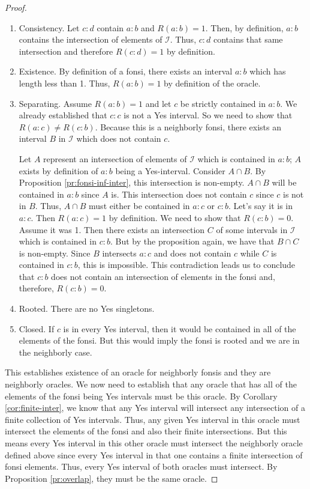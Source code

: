 \documentclass[12pt]{article}
\begin{document}
\begin{proof}
\begin{enumerate}
    \item Consistency. Let $c:d$ contain $a:b$ and $R(a:b)=1$. Then, by definition, $a:b$ contains the intersection of elements of $\mathcal{I}$. Thus, $c:d$ contains that same intersection and therefore $R(c:d)=1$ by definition. 
    \item Existence. By definition of a fonsi, there exists an interval $a:b$ which has length less than 1. Thus, $R(a:b)=1$ by definition of the oracle.
    \item Separating. Assume $R(a:b)=1$ and let $c$ be strictly contained in $a:b$. We already established that $c:c$ is not a Yes interval. So we need to show that $R(a:c) \neq R(c:b)$. Because this is a neighborly fonsi, there exists an interval $B$ in $\mathcal{I}$ which does not contain $c$. 
    
    Let $A$ represent an intersection of elements of $\mathcal{I}$ which is contained in $a:b$; $A$ exists by definition of $a:b$ being a Yes-interval.   Consider $A \cap B$. By Proposition \ref{pr:fonsi-inf-inter}, this intersection is non-empty. $A \cap B$ will be contained in $a:b$ since $A$ is.  This intersection does not contain $c$ since $c$ is not in $B$. Thus, $A \cap B$ must either be contained in $a:c$ or $c:b$. Let's say it is in $a:c$. Then $R(a:c) = 1$ by definition. We need to show that $R(c:b) = 0$. Assume it was 1. Then there exists an intersection $C$ of some intervals in $\mathcal{I}$ which is contained in $c:b$. But by the proposition again, we have that $B \cap C$ is non-empty. Since $B$ intersects $a:c$ and does not contain $c$ while $C$ is contained in $c:b$, this is impossible. This contradiction leads us to conclude that $c:b$ does not contain an intersection of elements in the fonsi and, therefore, $R(c:b) = 0$.
    \item Rooted. There are no Yes singletons. 
    \item Closed. If $c$ is in every Yes interval, then it would be contained in all of the elements of the fonsi. But this would imply the fonsi is rooted and we are in the neighborly case. 
\end{enumerate}

This establishes existence of an oracle for neighborly fonsis and they are neighborly oracles. We now need to establish that any oracle that has all of the elements of the fonsi being Yes intervals must be this oracle. By Corollary \ref{cor:finite-inter}, we know that any Yes interval will intersect any intersection of a finite collection of Yes intervals. Thus, any given Yes interval in this oracle must intersect the elements of the fonsi and also their finite intersections. But this means every Yes interval in this other oracle must intersect the neighborly oracle defined above since every Yes interval in that one contains a finite intersection of fonsi elements. Thus, every Yes interval of both oracles must intersect. By Proposition \ref{pr:overlap}, they must be the same oracle. 
\end{proof}
\end{document}
